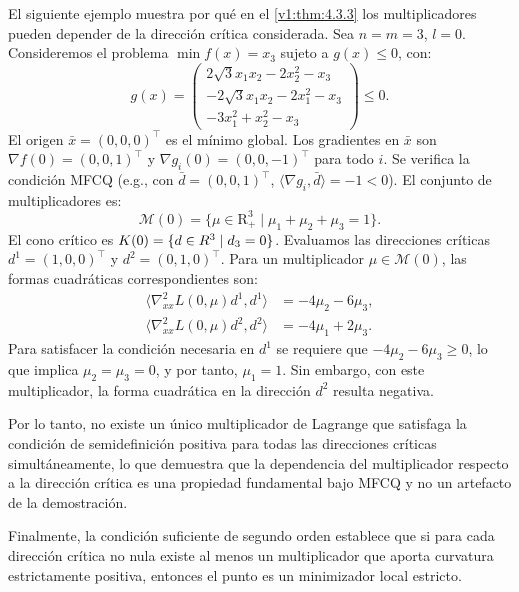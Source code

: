 \begin{example}\label{v1:exa:patologia_mfcq}
 El siguiente ejemplo muestra por qué en el \cref{v1:thm:4.3.3} los multiplicadores pueden depender de la dirección crítica considerada. Sea $n=m=3$, $l=0$. Consideremos el problema $\min f(x)=x_3$ sujeto a $g(x) \le 0$, con:
 \[
 g(x) = \begin{pmatrix} 2\sqrt{3}x_1 x_2 - 2x_2^2 - x_3 \\ -2\sqrt{3}x_1 x_2 - 2x_1^2 - x_3 \\ -3x_1^2 + x_2^2 - x_3 \end{pmatrix} \le 0.
 \]
 El origen $\bar{x} = (0,0,0)^\top$ es el mínimo global. Los gradientes en $\bar{x}$ son $\nabla f(0) = (0,0,1)^\top$ y $\nabla g_i(0) = (0,0,-1)^\top$ para todo $i$. Se verifica la condición MFCQ (e.g., con $\bar{d} = (0,0,1)^\top$, $\langle \nabla g_i, \bar{d} \rangle = -1 < 0$). El conjunto de multiplicadores es:
 \[
 \mathcal{M}(0) = \{ \mu \in \mathrm{R}_+^3 \mid \mu_1 + \mu_2 + \mu_3 = 1 \}.
 \]
 El cono crítico es $K(0) = \{ d \in R^3 \mid d_3 = 0 \}$. Evaluamos las direcciones críticas $d^1 = (1, 0, 0)^\top$ y $d^2 = (0, 1, 0)^\top$. Para un multiplicador $\mu \in \mathcal{M}(0)$, las formas cuadráticas correspondientes son:
 \begin{align*}
 \langle \nabla_{xx}^2 L(0, \mu) d^1, d^1 \rangle &= -4\mu_2 - 6\mu_3, \\
 \langle \nabla_{xx}^2 L(0, \mu) d^2, d^2 \rangle &= -4\mu_1 + 2\mu_3.
 \end{align*}
 Para satisfacer la condición necesaria en $d^1$ se requiere que $-4\mu_2 - 6\mu_3 \ge 0$, lo que implica $\mu_2 = \mu_3 = 0$, y por tanto, $\mu_1 = 1$. Sin embargo, con este multiplicador, la forma cuadrática en la dirección $d^2$ resulta negativa.
 
 Por lo tanto, no existe un único multiplicador de Lagrange que satisfaga la condición de semidefinición positiva para todas las direcciones críticas simultáneamente, lo que demuestra que la dependencia del multiplicador respecto a la dirección crítica es una propiedad fundamental bajo MFCQ y no un artefacto de la demostración.
\end{example}

Finalmente, la condición suficiente de segundo orden establece que si para cada dirección crítica no nula existe al menos un multiplicador que aporta curvatura estrictamente positiva, entonces el punto es un minimizador local estricto.

